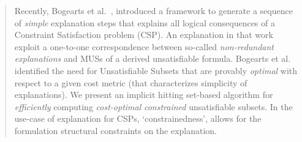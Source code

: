\documentclass[runningheads]{llncs}
\begin{document}
\begin{abstract}
	Recently, Bogearts et al.~\cite{bogaerts2020framework}, introduced a framework to generate a sequence of \emph{simple} explanation steps that explains all logical consequences of a Constraint Satisfaction problem (CSP). 
    An explanation in that work exploit a one-to-one correspondence between so-called \emph{non-redundant explanations} and MUSs of a derived unsatisfiable formula.
    Bogearts et al. \cite{bogaerts2020framework} identified the need for Unsatisfiable Subsets that are provably \emph{optimal} with respect to a given cost metric (that characterizes simplicity of explanations). 
	We present an implicit hitting set-based algorithm for \emph{efficiently} computing \emph{cost-optimal} \emph{constrained} unsatisfiable subsets. In the use-case of explanation for CSPs, `constrainedness', allows for the formulation structural constraints on the explanation.
%
%
%
%
%
%
%
%
%
%

\end{abstract}
\end{document}

